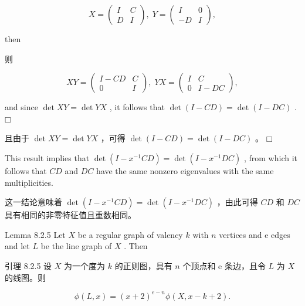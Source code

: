 \documentclass[10pt]{article}
\begin{document}
\[
X = \left( \begin{matrix} I & C \\  D & I \end{matrix}\right) ,\;Y = \left( \begin{matrix} I & 0 \\   - D & I \end{matrix}\right) ,
\]

then

\begin{tcolorbox}\relax
则
\end{tcolorbox}

\[
{XY} = \left( \begin{matrix} I - {CD} & C \\  0 & I \end{matrix}\right) ,\;{YX} = \left( \begin{matrix} I & C \\  0 & I - {DC} \end{matrix}\right) ,
\]

and since \(\det {XY} = \det {YX}\) , it follows that \(\det \left( {I - {CD}}\right)  = \det \left( {I - {DC}}\right)\) . \(□\)

\begin{tcolorbox}\relax
且由于 \(\det {XY} = \det {YX}\) ，可得 \(\det \left( {I - {CD}}\right)  = \det \left( {I - {DC}}\right)\) 。 \(□\)
\end{tcolorbox}

This result implies that \(\det \left( {I - {x}^{-1}{CD}}\right)  = \det \left( {I - {x}^{-1}{DC}}\right)\) , from which it follows that \({CD}\) and \({DC}\) have the same nonzero eigenvalues with the same multiplicities.

\begin{tcolorbox}\relax
这一结论意味着 \(\det \left( {I - {x}^{-1}{CD}}\right)  = \det \left( {I - {x}^{-1}{DC}}\right)\) ，由此可得 \({CD}\) 和 \({DC}\) 具有相同的非零特征值且重数相同。
\end{tcolorbox}

Lemma 8.2.5 Let \(X\) be a regular graph of valency \(k\) with \(n\) vertices and e edges and let \(L\) be the line graph of \(X\) . Then

\begin{tcolorbox}\relax
引理 8.2.5 设 \(X\) 为一个度为 \(k\) 的正则图，具有 \(n\) 个顶点和 e 条边，且令 \(L\) 为 \(X\) 的线图。则
\end{tcolorbox}

\[
\phi \left( {L,x}\right)  = {\left( x + 2\right) }^{e - n}\phi \left( {X,x - k + 2}\right) .
\]
\end{document}
